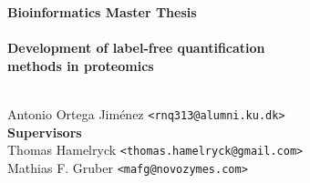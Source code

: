 \documentclass[11pt, a4paper]{report}
\begin{document}

    \thispagestyle{empty}
    \begin{adjustwidth}{-3cm}{-1.5cm}
    \vspace*{-1cm}
    \textbf{\Huge Bioinformatics Master Thesis} \\
    \vspace*{2.5cm} \\
    \textbf{\Huge Development of label-free quantification \\ methods in proteomics} \\
    \vspace*{.1cm} \\
    \begin{tabbing}
    Antonio Ortega Jiménez \hspace{1cm} \= \texttt{<rnq313@alumni.ku.dk>}
    \\[10.5cm] 
    
    \textbf{\Large Supervisors} \\
    Thomas Hamelryck \> \texttt{<thomas.hamelryck@gmail.com>} \\
    Mathias F. Gruber \> \texttt{<mafg@novozymes.com>} \\

    \end{tabbing}
    \end{adjustwidth}
    \ClearWallPaper

\setcounter{tocdepth}{2}
\tableofcontents %
\listoffigures   %
\newpage

\end{document}
